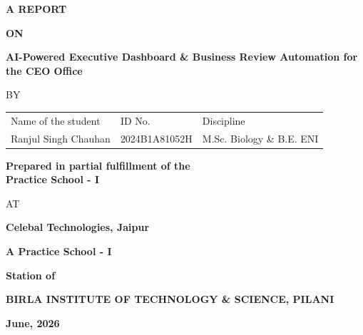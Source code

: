 \documentclass{book}
\begin{document}


\large

\thispagestyle{empty}
\centerline{\bf A REPORT}
\vspace*{0.3cm}
\centerline{\bf ON}
\vspace*{0.3cm}
\centerline{\bf AI-Powered Executive Dashboard \& Business Review Automation for the CEO Office}
\vspace*{2cm}

\centerline{BY}
\vspace*{1cm}

\begin{center}
	\begin{tabular}{lll}
		Name of the student & \hspace*{1cm} ID No. & \hspace*{1cm} Discipline \\
		Ranjul Singh Chauhan &\hspace*{1cm} 2024B1A81052H &\hspace*{1cm} M.Sc. Biology \& B.E. ENI \\
	\end{tabular}
\end{center}

\vspace*{2cm}
\begin{center}
	{\bf Prepared in partial fulfillment of the \\
	Practice School - I} \\
\end{center}

\vspace*{0.5cm}

\centerline{AT}

\vspace*{1cm}
        \centerline{\bf Celebal Technologies, Jaipur}
	\vspace{0.2cm}
	\centerline{\bf A Practice School - I}
	\vspace{0.2cm}
	\centerline{\bf Station of}
	\vspace{0.5cm}
\begin{figure}[ht]
\epsfxsize=1.0in
\centerline{}
\end{figure}

	\centerline{\bf BIRLA INSTITUTE OF TECHNOLOGY \& SCIENCE, PILANI}
	\vspace*{0.5cm}
	\centerline{\bf June, 2026}
	\newpage

\thispagestyle{empty}
\end{document}
